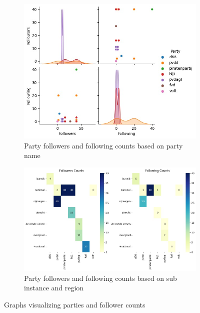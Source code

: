 \begin{figure}[ht]
  \centering
  \begin{subfigure}[h]{.49\linewidth}
    \includegraphics[width=\textwidth]{media/parties-following-counts.jpeg}
    \captionsetup{justification=centering}
    \caption{Party followers and following counts based on party name}
    \label{fig:partyfollowers}
  \end{subfigure}
  \begin{subfigure}[h]{.49\linewidth}
      \captionsetup{justification=centering}
      \includegraphics[width=\textwidth]{media/parties-following-region-counts.jpeg}
      \caption{Party followers and following counts based on sub instance and region}
      \label{fig:partyfollowingregions}
  \end{subfigure}
  \caption{Graphs visualizing parties and follower counts}
  \label{fig:partyfollowerstotal}
\end{figure}


